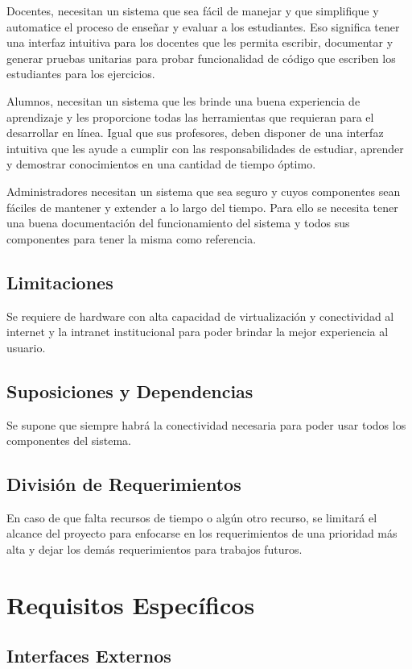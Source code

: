Docentes, necesitan un sistema que sea fácil de manejar y que simplifique y automatice el proceso de enseñar y evaluar a los estudiantes. Eso significa tener una interfaz intuitiva para los  docentes que les permita escribir, documentar y generar pruebas unitarias para probar funcionalidad de código que escriben los  estudiantes para los ejercicios.

Alumnos, necesitan un sistema que les brinde una buena experiencia de aprendizaje y les proporcione todas las herramientas que requieran para el desarrollar en línea. Igual que sus profesores, deben disponer de una interfaz intuitiva que les ayude a cumplir con las responsabilidades de estudiar, aprender y demostrar conocimientos en una cantidad de tiempo óptimo.

Administradores necesitan un sistema que sea seguro y cuyos componentes sean fáciles de mantener y extender a lo largo del tiempo. Para ello se necesita tener una buena documentación del funcionamiento del sistema y todos sus componentes para tener la misma como referencia.

\subsection{Limitaciones}
Se requiere de hardware con alta capacidad de virtualización y conectividad al internet y la intranet institucional para poder brindar la mejor experiencia al usuario.

\subsection{Suposiciones y Dependencias}
Se supone que siempre habrá la conectividad necesaria para poder usar todos los componentes del sistema.

\subsection{División de Requerimientos}
En caso de que falta recursos de tiempo o algún otro recurso, se limitará el alcance del proyecto para enfocarse en los requerimientos de una prioridad más alta y dejar los demás requerimientos para trabajos futuros.

\section{Requisitos Específicos}

\subsection{Interfaces Externos}

